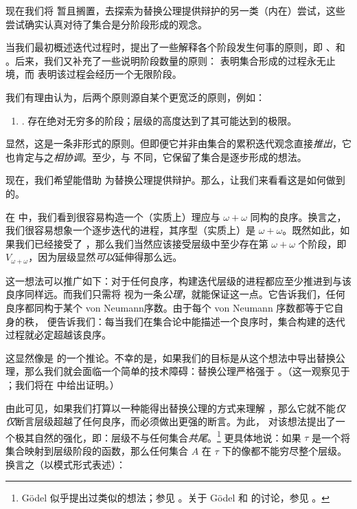 \documentclass[../../../include/open-logic-section]{subfiles}
\begin{document}

现在我们将 \limofsize{} 暂且搁置，去探索为替换公理提供辩护的另一类（内在）尝试，这些尝试确实认真对待了集合是分阶段形成的观念。

当我们最初概述迭代过程时，提出了一些解释各个阶段发生何事的原则，即 \stageshier、\stagesord 和 \stagesacc。后来，我们又补充了一些说明阶段数量的原则：\stagessucc{} 表明集合形成的过程永无止境，而 \stagesinf{} 表明该过程会经历一个无限阶段。

我们有理由认为，后两个原则源自某个更宽泛的原则，例如：

\begin{enumerate}
	\item[] \stagesinex. 存在绝对无穷多的阶段；层级的高度达到了其可能达到的极限。
\end{enumerate}

显然，这是一条非形式的原则。但即便它并非由集合的累积迭代观念直接\emph{推出}，它也肯定与之\emph{相协调}。至少，与 \limofsize{} 不同，它保留了集合是逐步形成的想法。

现在，我们希望能借助 \stagesinex{} 为替换公理提供辩护。那么，让我们来看看这是如何做到的。

在  中，我们看到很容易构造一个（实质上）理应与 $\omega+\omega$ 同构的良序。换言之，我们很容易想象一个逐步迭代的进程，其序型（实质上）是 $\omega+\omega$。既然如此，如果我们已经接受了 \stagesinex，那么我们当然应该接受层级中至少存在第 $\omega+\omega$ 个阶段，即 $V_{\omega+\omega}$，因为层级显然\emph{可以}延伸得那么远。

这一想法可以推广如下：对于任何良序，构建迭代层级的进程都应至少推进到与该良序同样远。而我们只需将  视为一条\emph{公理}，就能保证这一点。它告诉我们，任何良序都同构于某个 von Neumann序数。由于每个 von Neumann 序数都等于它自身的秩， 便告诉我们：每当我们在集合论中能描述一个良序时，集合构建的迭代过程就必定超越该良序。

这显然像是 \stagesinex{} 的一个推论。不幸的是，如果我们的目标是从这个想法中导出替换公理，那么我们就会面临一个简单的技术障碍：替换公理严格强于 。（这一观察见于 \citet[\S13.2]{Potter2004}；我们将在  中给出证明。）

由此可见，如果我们打算以一种能得出替换公理的方式来理解 \stagesinex{}，那么它就不能\emph{仅仅}断言层级超越了任何良序，而必须做出更强的断言。为此，\cite{Shoenfield:AST} 对该想法提出了一个极其自然的强化，即：层级不与任何集合\emph{共尾}。\footnote{Gödel 似乎提出过类似的想法；参见 \citet[p.~223]{Potter2004}。关于 Gödel 和 \citeauthor{Shoenfield:AST} 的讨论，参见 \citet[90--5]{Incurvati2020}。} 更具体地说：如果 $\tau$ 是一个将集合映射到层级阶段的函数，那么任何集合 $A$ 在 $\tau$ 下的像都不能穷尽整个层级。换言之（以模式形式表述）：
\end{document}
